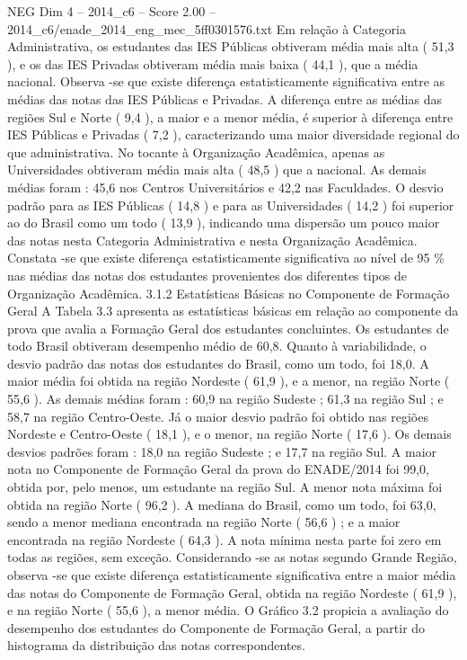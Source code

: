 \begin{textsample}{NEG Dim 4 – 2014\_c6 – Score 2.00 – 2014\_c6/enade\_2014\_eng\_mec\_5ff0301576.txt}
Em relação à Categoria Administrativa, os estudantes das IES Públicas obtiveram média mais alta ( 51,3 ), e os das IES Privadas obtiveram média mais baixa ( 44,1 ), que a média nacional.
Observa -se que existe diferença estatisticamente significativa entre as médias das notas das IES Públicas e Privadas.
A diferença entre as médias das regiões Sul e Norte ( 9,4 ), a maior e a menor média, é superior à diferença entre IES Públicas e Privadas ( 7,2 ), caracterizando uma maior diversidade regional do que administrativa.
No tocante à Organização Acadêmica, apenas as Universidades obtiveram média mais alta ( 48,5 ) que a nacional.
As demais médias foram : 45,6 nos Centros Universitários e 42,2 nas Faculdades.
O desvio padrão para as IES Públicas ( 14,8 ) e para as Universidades ( 14,2 ) foi superior ao do Brasil como um todo ( 13,9 ), indicando uma dispersão um pouco maior das notas nesta Categoria Administrativa e nesta Organização Acadêmica.
Constata -se que existe diferença estatisticamente significativa ao nível de 95 \% nas médias das notas dos estudantes provenientes dos diferentes tipos de Organização Acadêmica. 3.1.2 Estatísticas Básicas no Componente de Formação Geral A Tabela 3.3 apresenta as estatísticas básicas em relação ao componente da prova que avalia a Formação Geral dos estudantes concluintes.
Os estudantes de todo Brasil obtiveram desempenho médio de 60,8.
Quanto à variabilidade, o desvio padrão das notas dos estudantes do Brasil, como um todo, foi 18,0.
A maior média foi obtida na região Nordeste ( 61,9 ), e a menor, na região Norte ( 55,6 ).
As demais médias foram : 60,9 na região Sudeste ; 61,3 na região Sul ; e 58,7 na região Centro-Oeste.
Já o maior desvio padrão foi obtido nas regiões Nordeste e Centro-Oeste ( 18,1 ), e o menor, na região Norte ( 17,6 ).
Os demais desvios padrões foram : 18,0 na região Sudeste ; e 17,7 na região Sul.
A maior nota no Componente de Formação Geral da prova do ENADE/2014 foi 99,0, obtida por, pelo menos, um estudante na região Sul.
A menor nota máxima foi obtida na região Norte ( 96,2 ).
A mediana do Brasil, como um todo, foi 63,0, sendo a menor mediana encontrada na região Norte ( 56,6 ) ; e a maior encontrada na região Nordeste ( 64,3 ).
A nota mínima nesta parte foi zero em todas as regiões, sem exceção.
Considerando -se as notas segundo Grande Região, observa -se que existe diferença estatisticamente significativa entre a maior média das notas do Componente de Formação Geral, obtida na região Nordeste ( 61,9 ), e na região Norte ( 55,6 ), a menor média.
O Gráfico 3.2 propicia a avaliação do desempenho dos estudantes do Componente de Formação Geral, a partir do histograma da distribuição das notas correspondentes.

\end{textsample}
